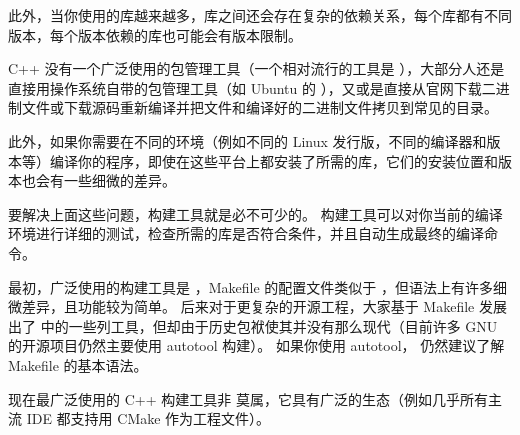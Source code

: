 此外，当你使用的库越来越多，库之间还会存在复杂的依赖关系，每个库都有不同版本，每个版本依赖的库也可能会有版本限制。

C++ 没有一个广泛使用的包管理工具（一个相对流行的工具是 ），大部分人还是直接用操作系统自带的包管理工具（如 Ubuntu 的 ），又或是直接从官网下载二进制文件或下载源码重新编译并把文件和编译好的二进制文件拷贝到常见的目录。

此外，如果你需要在不同的环境（例如不同的 Linux 发行版，不同的编译器和版本等）编译你的程序，即使在这些平台上都安装了所需的库，它们的安装位置和版本也会有一些细微的差异。

要解决上面这些问题，构建工具就是必不可少的。 构建工具可以对你当前的编译环境进行详细的测试，检查所需的库是否符合条件，并且自动生成最终的编译命令。

最初，广泛使用的构建工具是 ，Makefile 的配置文件类似于 ，但语法上有许多细微差异，且功能较为简单。 后来对于更复杂的开源工程，大家基于 Makefile 发展出了  中的一些列工具，但却由于历史包袱使其并没有那么现代（目前许多 GNU 的开源项目仍然主要使用 autotool 构建）。 如果你使用 autotool， 仍然建议了解 Makefile 的基本语法。

现在最广泛使用的 C++ 构建工具非  莫属，它具有广泛的生态（例如几乎所有主流 IDE 都支持用 CMake 作为工程文件）。
